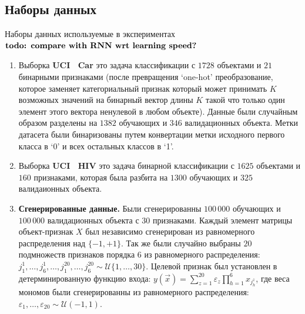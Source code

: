 \subsection{Наборы данных \label{sec:exp-datasets}}
Наборы данных используемые в экспериментах $\textbf{todo: compare with RNN wrt learning speed?}$
\begin{enumerate}
  \item Выборка \textbf{UCI~\cite{Lichman2013UCI} Car} это задача  классификации с $1728$ объектами и $21$ бинарными признаками (после превращения `one-hot' преобразование, которое заменяет категориальный признак который может принимать $K$ возможных значений на бинарный вектор длины $K$ такой что только один элемент этого вектора ненулевой в любом объекте).
  Данные были случайным образом разделены на  $1382$ обучающих  и $346$ валидационных объекта. Метки датасета были бинаризованы путем конвертации метки исходного первого класса в `0' и всех остальных классов в `1'.

  \item Выборка \textbf{UCI~\cite{Lichman2013UCI} HIV} это задача бинарной классификации с $1625$ объектами и $160$ признаками, которая была разбита на $1300$ обучающих и $325$ валидаионных объекта.

  \item \textbf{Сгенерированные данные.} Были сгенерированны $100\,000$ обучающих и $100\,000$ валидационных объекта с $30$ признаками.
  Каждый элемент матрицы объект-признак $X$ был независимо сгенерирован из равномерного распределения над $\{-1, +1\}$.
  Так же были случайно выбраны $20$ подмножеств признаков порядка 6 из равномерного распределения: $j^1_1, \ldots, j^1_{6}, \ldots, j^{20}_1, \ldots, j^{20}_{6} \sim \mathcal{U}\{1, \ldots, 30\}$.
  Целевой признак был установлен в детерминированную функцию входа: $y(\vec{x}) = \sum_{z=1}^{20} \varepsilon_z \prod_{h=1}^{6} x_{j^z_h}$, где веса мономов были сгенерированны из равномерного распределения: $\varepsilon_1, \ldots, \varepsilon_{20} \sim \mathcal{U}(-1, 1)$.

\end{enumerate}


